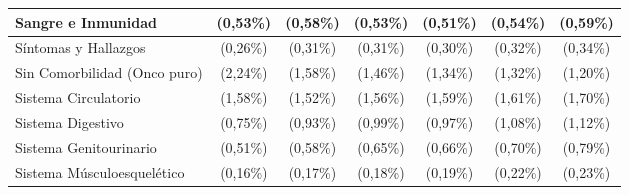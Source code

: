 \begin{table}[htbp]
\begin{tabular}{|l|c|c|c|c|c|c|}
\parbox[t]{3.8cm}{Sangre e Inmunidad} & \parbox[t]{1.5cm}{ (0,53\%)} & \parbox[t]{1.5cm}{ (0,58\%)} & \parbox[t]{1.5cm}{ (0,53\%)} & \parbox[t]{1.5cm}{ (0,51\%)} & \parbox[t]{1.5cm}{ (0,54\%)} & \parbox[t]{1.5cm}{ (0,59\%)} \\ \hline
\parbox[t]{3.8cm}{Síntomas y Hallazgos} & \parbox[t]{1.5cm}{ (0,26\%)} & \parbox[t]{1.5cm}{ (0,31\%)} & \parbox[t]{1.5cm}{ (0,31\%)} & \parbox[t]{1.5cm}{ (0,30\%)} & \parbox[t]{1.5cm}{ (0,32\%)} & \parbox[t]{1.5cm}{ (0,34\%)} \\ \hline
\parbox[t]{3.8cm}{Sin Comorbilidad (Onco puro)} & \parbox[t]{1.5cm}{ (2,24\%)} & \parbox[t]{1.5cm}{ (1,58\%)} & \parbox[t]{1.5cm}{ (1,46\%)} & \parbox[t]{1.5cm}{ (1,34\%)} & \parbox[t]{1.5cm}{ (1,32\%)} & \parbox[t]{1.5cm}{ (1,20\%)} \\ \hline
\parbox[t]{3.8cm}{Sistema Circulatorio} & \parbox[t]{1.5cm}{ (1,58\%)} & \parbox[t]{1.5cm}{ (1,52\%)} & \parbox[t]{1.5cm}{ (1,56\%)} & \parbox[t]{1.5cm}{ (1,59\%)} & \parbox[t]{1.5cm}{ (1,61\%)} & \parbox[t]{1.5cm}{ (1,70\%)} \\ \hline
\parbox[t]{3.8cm}{Sistema Digestivo} & \parbox[t]{1.5cm}{ (0,75\%)} & \parbox[t]{1.5cm}{ (0,93\%)} & \parbox[t]{1.5cm}{ (0,99\%)} & \parbox[t]{1.5cm}{ (0,97\%)} & \parbox[t]{1.5cm}{ (1,08\%)} & \parbox[t]{1.5cm}{ (1,12\%)} \\ \hline
\parbox[t]{3.8cm}{Sistema Genitourinario} & \parbox[t]{1.5cm}{ (0,51\%)} & \parbox[t]{1.5cm}{ (0,58\%)} & \parbox[t]{1.5cm}{ (0,65\%)} & \parbox[t]{1.5cm}{ (0,66\%)} & \parbox[t]{1.5cm}{ (0,70\%)} & \parbox[t]{1.5cm}{ (0,79\%)} \\ \hline
\parbox[t]{3.8cm}{Sistema Músculoesquelético} & \parbox[t]{1.5cm}{ (0,16\%)} & \parbox[t]{1.5cm}{ (0,17\%)} & \parbox[t]{1.5cm}{ (0,18\%)} & \parbox[t]{1.5cm}{ (0,19\%)} & \parbox[t]{1.5cm}{ (0,22\%)} & \parbox[t]{1.5cm}{ (0,23\%)} \\ \hline

\end{tabular}
\end{table}
